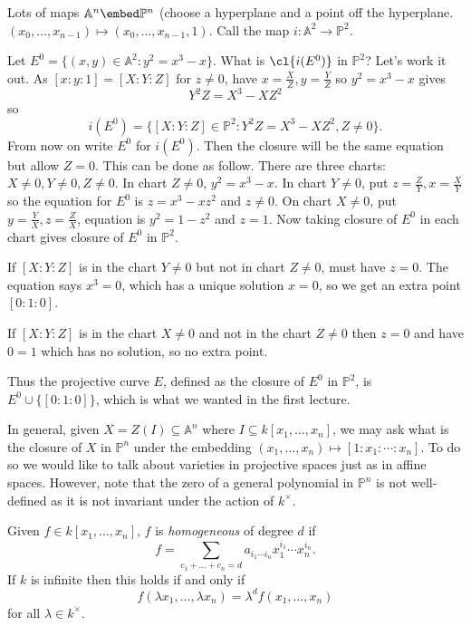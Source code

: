 \documentclass[a4paper]{article}
\renewcommand{\A}{\mathbb{A}}
\renewcommand*{\P}{\mathbb{P}}
\begin{document}
Lots of maps \(\A^n \embed \P^n\) (choose a hyperplane and a point off the hyperplane. \((x_0, \dots, x_{n -1}) \mapsto (x_0, \dots, x_{n - 1}, 1)\). Call the map \(i: \A^2 \to \P^2\).

Let \(E^0 = \{(x, y) \in \A^2: y^2 = x^3 - x\}\). What is \(\cl{i(E^0)}\) in \(\P^2\)? Let's work it out. As \([x: y: 1] = [X: Y: Z]\) for \(z \neq 0\), have \(x = \frac{X}{Z}, y = \frac{Y}{Z}\) so \(y^2 = x^3 - x\) gives
\[
  Y^2Z = X^3 - XZ^2
\]
so
\[
  i(E^0) = \{[X: Y: Z] \in \P^2: Y^2Z = X^3 - XZ^2, Z \neq 0\}.
\]
From now on write \(E^0\) for \(i(E^0)\). Then the closure will be the same equation but allow \(Z = 0\). This can be done as follow. There are three charts: \(X \neq 0, Y \neq 0, Z \neq 0\). In chart \(Z \neq 0\), \(y^2 = x^3 - x\). In chart \(Y \neq 0\), put \(z = \frac{Z}{Y}, x = \frac{X}{Y}\) so the equation for \(E^0\) is \(z = x^3 - xz^2\) and \(z \neq 0\). On chart \(X \neq 0\), put \(y = \frac{Y}{X}, z = \frac{Z}{X}\), equation is \(y^2 = 1 - z^2\) and \(z = 1\). Now taking closure of \(E^0\) in each chart gives closure of \(E^0\) in \(\P^2\).

If \([X: Y: Z]\) is in the chart \(Y \neq 0\) but not in chart \(Z \neq 0\), must have \(z = 0\). The equation says \(x^3 = 0\), which has a unique solution \(x = 0\), so we get an extra point \([0: 1: 0]\).

If \([X: Y: Z]\) is  in the chart \(X \neq 0\) and not in the chart \(Z \neq 0\) then \(z = 0\) and have \(0 = 1\) which has no solution, so no extra point.

Thus the projective curve \(E\), defined as the closure of \(E^0\) in \(\P^2\), is \(E^0 \cup \{[0: 1: 0]\}\), which is what we wanted in the first lecture.

In general, given \(X = Z(I) \subseteq \A^n\) where \(I \subseteq k[x_1, \dots, x_n]\), we may ask what is the closure of \(X\) in \(\P^n\) under the embedding \((x_1, \dots, x_n) \mapsto [1: x_1: \cdots : x_n]\). To do so we would like to talk about varieties in projective spaces just as in affine spaces. However, note that the zero of a general polynomial in \(\P^n\) is not well-defined as it is not invariant under the action of \(k^\times\).

\begin{definition}
  Given \(f \in k[x_1, \dots, x_n]\), \(f\) is \emph{homogeneous} of degree \(d\) if
  \[
    f = \sum_{c_1 + \dots + c_n = d} a_{i_1 \cdots i_n} x_1^{i_1} \cdots x_n^{i_n}.
  \]
  If \(k\) is infinite then this holds if and only if
  \[
    f(\lambda x_1, \dots, \lambda x_n) = \lambda^d f(x_1, \dots, x_n)
  \]
  for all \(\lambda \in k^\times\).
\end{definition}
\end{document}
